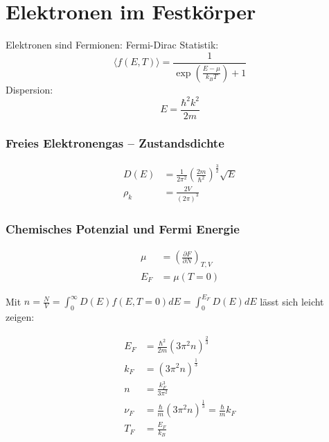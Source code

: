 \section{Elektronen im Festkörper}

Elektronen sind Fermionen: Fermi-Dirac Statistik:
\begin{equation*}
    \langle f(E,T) \rangle = \frac{1}{\exp \left(\frac{E-\mu}{k_B T}\right)+1}
\end{equation*}
Dispersion:
\begin{equation*}
    E = \frac{\hbar^2 k^2}{2m}
\end{equation*}


\subsubsection*{Freies Elektronengas – Zustandsdichte}

\begin{equation*}
    \begin{aligned}
        D(E) &= \frac{1}{2 \pi^2} \left(\frac{2m}{\hbar^2}\right)^{\frac{3}{2}} \sqrt{E} \\
        \rho_k &= \frac{2V}{(2 \pi)^3}
    \end{aligned}
\end{equation*}


\subsubsection*{Chemisches Potenzial und Fermi Energie}
\begin{equation*}
    \begin{aligned}
        \mu &= \left(\frac{\partial F}{\partial N}\right)_{T,V} \\
        E_F &= \mu (T=0)
    \end{aligned}
\end{equation*}

Mit $n=\frac{N}{V} = \int_0^\infty D(E)f(E,T=0)dE =\int_0^{E_F} D(E)dE$ lässt sich leicht zeigen:

\begin{equation*}
    \begin{aligned}
        E_F &= \frac{\hbar^2}{2m} \left(3 \pi^2 n\right)^{\frac{2}{3}} \\
        k_F &= \left(3 \pi^2 n\right)^{\frac{1}{3}} \\
        n &= \frac{k_F^3}{3 \pi^2} \\
        \nu_F &= \frac{\hbar}{m} \left(3 \pi^2 n\right)^{\frac{1}{3}} = \frac{\hbar}{m} k_F \\
        T_F &= \frac{E_F}{k_B}
    \end{aligned}
\end{equation*}


